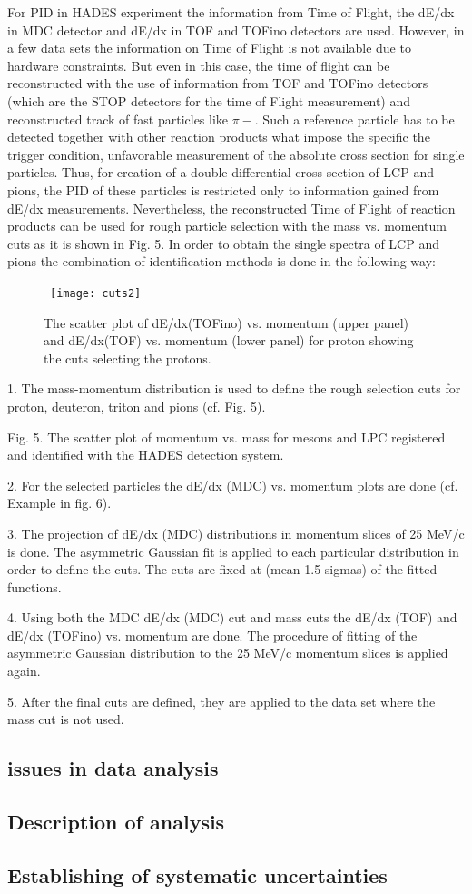 For PID in HADES experiment the information from Time of Flight, the dE/dx in MDC detector and dE/dx in TOF and TOFino detectors are used. However, in a few data sets the information on Time of Flight is not available due to hardware constraints. But even in this case, the time of flight can be reconstructed with the use of information from TOF and TOFino detectors (which are the STOP detectors for the time of Flight measurement) and reconstructed track of fast particles like $\pi-$.  Such a reference particle has to be detected together with other reaction products what impose the specific the trigger condition, unfavorable measurement of the absolute cross section for single particles. Thus, for creation of a double differential cross section of LCP and pions, the PID of these particles is restricted only to information gained from dE/dx measurements. Nevertheless, the reconstructed Time of Flight of reaction products can be used for rough particle selection with the mass vs. momentum cuts as it is shown in Fig. 5.
In order to obtain the single spectra of LCP and pions the combination of identification methods is done in the following way:
\begin{figure}
	\centering\
	\texttt{[image: cuts2]}
	\caption{The scatter plot of dE/dx(TOFino) vs. momentum (upper panel) and dE/dx(TOF) vs. momentum (lower panel) for proton showing the cuts selecting the protons.}
	\label{TofCut}
\end{figure}
1. The mass-momentum distribution is used to define the rough selection cuts for proton, deuteron, triton and pions (cf. Fig. 5).



Fig. 5. The scatter plot of momentum vs. mass for mesons and LPC registered and identified with the HADES detection system.


2. For the selected particles the dE/dx (MDC) vs. momentum plots are done (cf. Example in fig. 6).

3. The projection of dE/dx (MDC) distributions in momentum slices of 25 MeV/c is done. The asymmetric Gaussian fit is applied to each particular distribution in order to define the cuts. The cuts are fixed at (mean 1.5 sigmas) of the fitted functions.

4. Using both the MDC dE/dx (MDC) cut and mass cuts the dE/dx (TOF) and dE/dx (TOFino) vs. momentum are done. The procedure of fitting of the asymmetric Gaussian distribution to the 25 MeV/c momentum slices is applied again.

5. After the final cuts are defined, they are applied to the data set where the mass cut is not used.


\subsection{issues in data analysis}
\subsection{Description of analysis}
\subsection{Establishing of systematic uncertainties}
